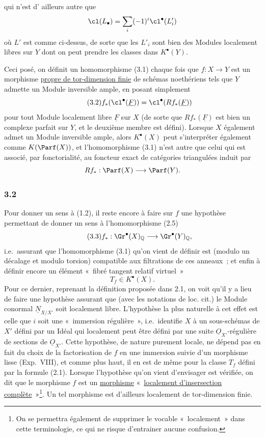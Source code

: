 qui n'est d'
ailleurs autre que
\[
\cl(L_\bullet)=\sum_i(-1)^i\cl^\bullet(L'_i)
\]
où $L'$ est comme ci-dessus, de sorte que les $L'_i$ sont bien des Modules localement libres sur $Y$ dont on peut prendre les classes dans $K^\bullet(Y)$.

Ceci posé, on définit un homomorphisme (3.1) chaque fois que $f:X\to Y$ est un morphisme \underline{propre de tor-dimension finie} de schémas noethériens tels que $Y$ admette un Module inversible ample, en posant simplement
\begin{equation}\tag{3.2}
f_*(\cl^\bullet(\underline F))=\cl^\bullet(Rf_*(\underline F))
\end{equation}
pour tout Module localement libre $\underline F$ sur $X$ (de sorte que $Rf_*(\underline F)$ est bien un complexe parfait sur $Y$, et le deuxième membre est défini). Lorsque $X$ également admet un Module inversible ample, alors $K^\bullet(X)$ peut s'interpréter également comme $K(\Parf(X))$, et l'homomorphisme (3.1) n'est autre que celui qui est associé, par fonctorialité, au foncteur exact de catégories triangulées induit par
\[
Rf_*:\Parf(X)\longrightarrow \Parf(Y).
\]

\subsubsection*{3.2}
Pour donner un sens à (1.2), il reste encore à faire sur $f$ une hypothèse permettant de donner un sens à l'homomorphisme (2.5)
\begin{equation}\tag{3.3}
f_*:\Gr^\bullet(X)_{\mathbb Q}\longrightarrow \Gr^\bullet(Y)_{\mathbb Q},
\end{equation}
i.e.\ assurant que l'homomorphisme (3.1) qu'on vient de définir est (modulo un décalage et modulo torsion) compatible aux filtrations de ces anneaux~; et enfin à définir encore un élément «~fibré tangent relatif virtuel~»
\[
T_f\in K^\bullet(X).
\]
Pour ce dernier, reprenant la définition proposée dans 2.1, on voit qu'il y a lieu de faire une hypothèse assurant que (avec les notations de loc. cit.) le Module conormal $\underline N_{X/X'}$ soit localement libre. L'hypothèse la plus naturelle à cet effet est celle que $i$ soit une «~immersion régulière~», i.e.\ identifie $X$ à un sous-schémas de $X'$ défini par un Idéal qui localement peut être défini par une suite $\underline O_{X'}$-régulière de sections de $\underline O_{X'}$. Cette hypothèse, de nature purement locale, ne dépend pas en fait du choix de la factorisation de $f$ en une immersion suivie d'un morphisme lisse (Exp.\ VIII), et comme plus haut, il en est de même pour la classe $T_f$ défini par la formule (2.1). Lorsque l'hypothèse qu'on vient d'envisager est vérifiée, on dit que le morphisme $f$ est un \underline{morphisme} «~\underline{localement d'insersection complète}~»\footnote{On se permettra également de supprimer le vocable «~localement~» dans cette terminologie, ce qui ne risque d'entrainer aucune confusion.}. Un tel morphisme est d'ailleurs localement de tor-dimension finie.


